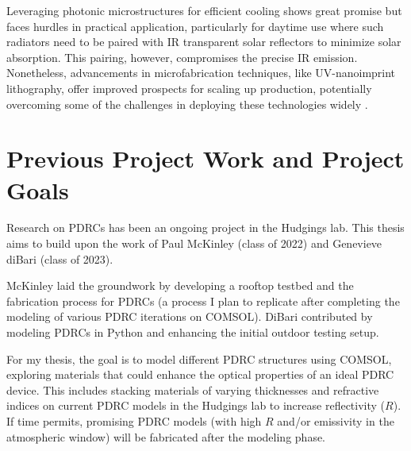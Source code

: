 Leveraging photonic microstructures for efficient cooling shows great promise but faces hurdles in practical application, particularly for daytime use where such radiators need to be paired with IR transparent solar reflectors to minimize solar absorption. This pairing, however, compromises the precise IR emission. Nonetheless, advancements in microfabrication techniques, like UV-nanoimprint lithography, offer improved prospects for scaling up production, potentially overcoming some of the challenges in deploying these technologies widely \cite{hossain_radiative_2016}.


\section{Previous Project Work and Project Goals}
Research on PDRCs has been an ongoing project in the Hudgings lab. This thesis aims to build upon the work of Paul McKinley (class of 2022) and Genevieve diBari (class of 2023).

McKinley laid the groundwork by developing a rooftop testbed and the fabrication process for PDRCs (a process I plan to replicate after completing the modeling of various PDRC iterations on COMSOL). DiBari contributed by modeling PDRCs in Python and enhancing the initial outdoor testing setup.

For my thesis, the goal is to model different PDRC structures using COMSOL, exploring materials that could enhance the optical properties of an ideal PDRC device. This includes stacking materials of varying thicknesses and refractive indices on current PDRC models in the Hudgings lab to increase reflectivity ($R$). If time permits, promising PDRC models (with high $R$ and/or emissivity in the atmospheric window) will be fabricated after the modeling phase.
